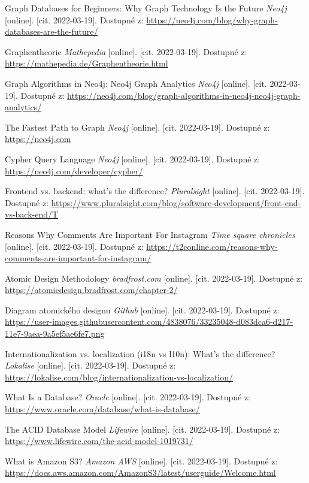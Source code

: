 \begin{thebibliography}{55}
    Graph Databases for Beginners: Why Graph Technology Is the Future \textit{Neo4j} [online]. [cit. 2022-03-19]. Dostupné z: \url{https://neo4j.com/blog/why-graph-databases-are-the-future/}
     
    Graphentheorie \textit{Mathepedia} [online]. [cit. 2022-03-19]. Dostupné z: \url{https://mathepedia.de/Graphentheorie.html}
     
    Graph Algorithms in Neo4j: Neo4j Graph Analytics \textit{Neo4j} [online]. [cit. 2022-03-19]. Dostupné z: \url{https://neo4j.com/blog/graph-algorithms-in-neo4j-neo4j-graph-analytics/}
     
    The Fastest Path to Graph \textit{Neo4j} [online]. [cit. 2022-03-19]. Dostupné z: \url{https://neo4j.com}
            
   
    Cypher Query Language \textit{Neo4j} [online]. [cit. 2022-03-19]. Dostupné z: \url{https://neo4j.com/developer/cypher/}
        
    Frontend vs. backend: what's the difference? \textit{Pluralsight} [online]. [cit. 2022-03-19]. Dostupné z: \url{https://www.pluralsight.com/blog/software-development/front-end-vs-back-end/T}
        
    Reasons Why Comments Are Important For Instagram \textit{Time square chronicles} [online]. [cit. 2022-03-19]. Dostupné z: \url{https://t2conline.com/reasons-why-comments-are-important-for-instagram/}
                 
    Atomic Design Methodology \textit{bradfrost.com} [online]. [cit. 2022-03-19]. Dostupné z: \url{https://atomicdesign.bradfrost.com/chapter-2/}
         
    Diagram atomického designu \textit{Github} [online]. [cit. 2022-03-19]. Dostupné z: \url{https://user-images.githubusercontent.com/4838076/33235048-d083dca6-d217-11e7-9aea-9a5ef5ae6fe7.png}
         
    Internationalization vs. localization (i18n vs l10n): What’s the difference? \textit{Lokalise} [online]. [cit. 2022-03-19]. Dostupné z: \url{https://lokalise.com/blog/internationalization-vs-localization/}
                
    What Is a Database? \textit{Oracle} [online]. [cit. 2022-03-19]. Dostupné z: \url{https://www.oracle.com/database/what-is-database/}
         
    The ACID Database Model \textit{Lifewire} [online]. [cit. 2022-03-19]. Dostupné z: \url{https://www.lifewire.com/the-acid-model-1019731/}
         
    What is Amazon S3? \textit{Amazon AWS} [online]. [cit. 2022-03-19]. Dostupné z: \url{https://docs.aws.amazon.com/AmazonS3/latest/userguide/Welcome.html}
    
    
\end{thebibliography}
